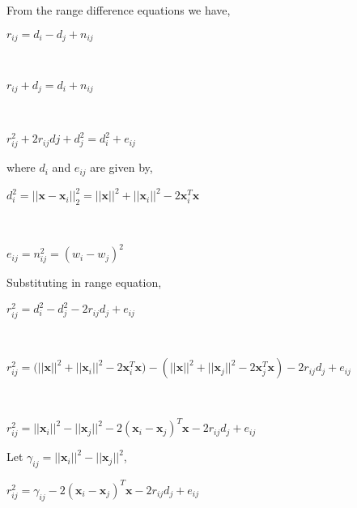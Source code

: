\documentclass[a4 paper]{article}
\begin{document}
\newpage
{}

\solution From the range difference equations we have,
\\ \centerline{$ r_{ij} = d_{i} - d_{j} + n_{ij} $}
\\ \centerline{$ r_{ij} + d_{j} = d_{i} + n_{ij} $}
\\ \centerline{$ r_{ij}^{2} + 2r_{ij}d{j}+ d_{j}^2 = d_{i}^2 + e_{ij} $}

where $ d_{i} $ and $ e_{ij} $ are given by,
\\ \centerline{$ d_{i}^2 = ||\mathbf{x}-\mathbf{x}_{i}||_{2}^{2} = ||\mathbf{x}||^{2} + ||\mathbf{x}_{i}||^{2} - 2\mathbf{x}_{i}^{T}\mathbf{x} $}
\\ \centerline{$ e_{ij} = n_{ij}^2 = (w_{i} - w_{j})^2 $}

Substituting in range equation,
\\ \centerline{$ r_{ij}^{2} = d_{i}^{2} - d_{j}^{2} - 2r_{ij}d_{j} + e_{ij} $}
\\ \centerline{$ r_{ij}^2 = (||\mathbf{x}||^{2} + ||\mathbf{x}_{i}||^{2} - 2\mathbf{x}_{i}^{T}\mathbf{x)} - (||\mathbf{x}||^{2} + ||\mathbf{x}_{j}||^{2} - 2\mathbf{x}_{j}^{T}\mathbf{x})  - 2r_{ij}d_{j} + e_{ij} $}
\\ \centerline{$ r_{ij}^{2} = ||\mathbf{x}_{i}||^{2} - ||\mathbf{x}_{j}||^{2} - 2(\mathbf{x}_{i} - \mathbf{x}_{j})^{T}\mathbf{x} -2r_{ij}d_{j} + e_{ij} $}

Let $\gamma_{ij} = ||\mathbf{x}_{i}||^{2} - ||\mathbf{x}_{j}||^{2} $,
\\ \centerline{$ r_{ij}^{2} = \gamma_{ij} - 2(\mathbf{x}_{i} - \mathbf{x}_{j})^{T}\mathbf{x} -2r_{ij}d_{j} + e_{ij} $}
\end{document}
